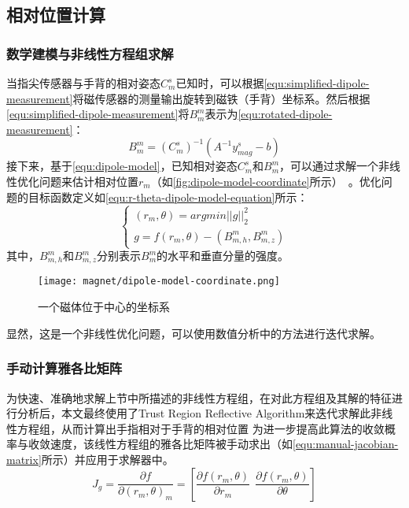 \subsection{相对位置计算}
\subsubsection{数学建模与非线性方程组求解}
当指尖传感器与手背的相对姿态$C_m^s$已知时，可以根据\autoref{equ:simplified-dipole-measurement}将磁传感器的测量输出旋转到磁铁（手背）坐标系。然后根据\autoref{equ:simplified-dipole-measurement}将$B_m^m$表示为\autoref{equ:rotated-dipole-measurement}：
\begin{equation}
    \label{equ:rotated-dipole-measurement}
    B_m^m = (C_m^s)^{-1}(A^{-1}y_{mag}^s - b)
\end{equation}
接下来，基于\autoref{equ:dipole-model}，已知相对姿态$C^s_m$和$B_m^m$，可以通过求解一个非线性优化问题来估计相对位置$r_m$（如\autoref{fig:dipole-model-coordinate}所示）~\cite{mainArticle2}。优化问题的目标函数定义如\autoref{equ:r-theta-dipole-model-equation}所示：
\begin{equation}
    \label{equ:r-theta-dipole-model-equation}
    \begin{cases}
        (r_m, \theta) = argmin{||g||}_2^2 \\
        g = f(r_m, \theta) - (B_{m,h}^m,B_{m,z}^m)
    \end{cases}
\end{equation}
其中，$B_{m,h}^m$和$B_{m,z}^m$分别表示$B_m^m$的水平和垂直分量的强度。

\begin{figure}[H]
    \centering
    \texttt{[image: magnet/dipole-model-coordinate.png]}
    \caption{\label{fig:dipole-model-coordinate}一个磁体位于中心的坐标系}
\end{figure}

显然，这是一个非线性优化问题，可以使用数值分析中的方法进行迭代求解。
\subsubsection{手动计算雅各比矩阵}
为快速、准确地求解上节中所描述的非线性方程组，在对此方程组及其解的特征进行分析后，本文最终使用了Trust Region Reflective Algorithm来迭代求解此非线性方程组，从而计算出手指相对于手背的相对位置
为进一步提高此算法的收敛概率与收敛速度，该线性方程组的雅各比矩阵被手动求出（如\autoref{equ:manual-jacobian-matrix}所示）并应用于求解器中。
\begin{equation}
    \label{equ:manual-jacobian-matrix}
    J_g = \frac{\partial{f}}{\partial{{(r_m, \theta)}_m}} = [\frac{\partial{f(r_m,\theta)}}{\partial{r_m}}\ \ \frac{\partial{f(r_m,\theta)}}{\partial{\theta}}]
\end{equation}


